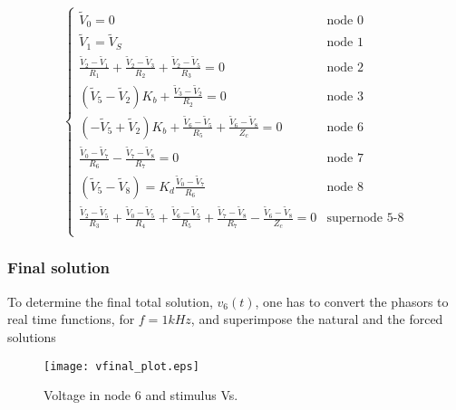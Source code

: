 \begin{equation}
  \begin{cases}
  \tilde{V}_0 = 0 & \mbox{node 0} \\
   \tilde{V}_1 = \tilde{V}_S & \mbox{node 1} \\
  \frac{\tilde{V}_2-\tilde{V}_1}{R_1}+\frac{\tilde{V}_2-\tilde{V}_3}{R_2}+\frac{\tilde{V}_2-\tilde{V}_5}{R_3} = 0 & \mbox{node 2} \\
  (\tilde{V}_5-\tilde{V}_2)K_b + \frac{\tilde{V}_3-\tilde{V}_2}{R_2} = 0 & \mbox{node 3} \\
  (-\tilde{V}_5+\tilde{V}_2)K_b + \frac{\tilde{V}_6-\tilde{V}_5}{R_5} + \frac{\tilde{V}_6-\tilde{V}_8}{Z_c} = 0 & \mbox{node 6} \\
  \frac{\tilde{V}_0-\tilde{V}_7}{R_6} - \frac{\tilde{V}_7-\tilde{V}_8}{R_7} = 0 & \mbox{node 7} \\
  (\tilde{V}_5-\tilde{V}_8) = K_d \frac{\tilde{V}_0-\tilde{V}_7}{R_6} & \mbox{node 8} \\
  \frac{\tilde{V}_2-\tilde{V}_5}{R_3} + \frac{\tilde{V}_0-\tilde{V}_5}{R_4} + \frac{\tilde{V}_6-\tilde{V}_5}{R_5} + \frac{\tilde{V}_7-\tilde{V}_8}{R_7} - \frac{\tilde{V}_6-\tilde{V}_8}{Z_c} = 0 & \mbox{supernode 5-8} \\ 
  \end{cases}
\end{equation}








\subsubsection{Final solution}  %
To determine the final total solution, $v_6(t)$, one has to convert the phasors to real time functions, for $f=1kHz$, and superimpose the natural and the forced solutions




\begin{figure}[h] \centering
\texttt{[image: vfinal\_plot.eps]}
\caption{Voltage in node 6 and stimulus Vs.}
\label{fig:final}
\end{figure}


